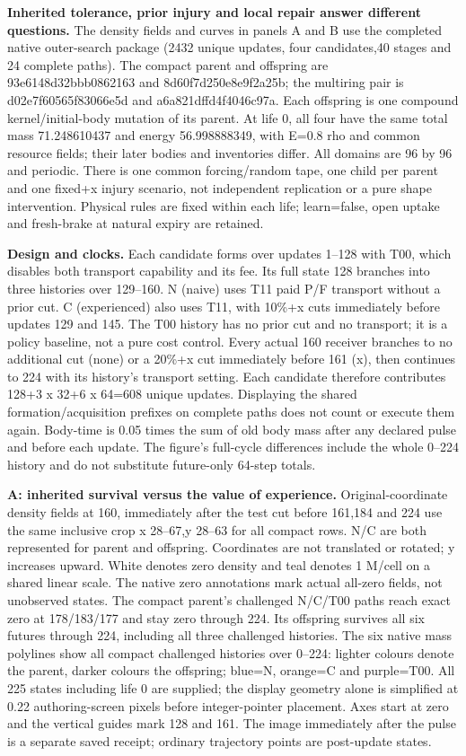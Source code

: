 \textbf{Inherited tolerance, prior injury and local repair answer different questions.}
The density fields and curves in panels A and B use the completed native outer-search package (2432 unique updates, four candidates,40 stages and 24 complete paths). The compact parent and offspring are 93e6148d32bbb0862163 and 8d60f7d250e8e9f2a25b; the multiring pair is d02e7f60565f83066e5d and a6a821dffd4f4046c97a. Each offspring is one compound kernel/initial-body mutation of its parent. At life 0, all four have the same total mass 71.248610437 and energy 56.998888349, with E=0.8 rho and common resource fields; their later bodies and inventories differ. All domains are 96 by 96 and periodic. There is one common forcing/random tape, one child per parent and one fixed+x injury scenario, not independent replication or a pure shape intervention. Physical rules are fixed within each life; learn=false, open uptake and fresh-brake at natural expiry are retained.

\textbf{Design and clocks.} Each candidate forms over updates 1--128 with T00, which disables both transport capability and its fee. Its full state 128 branches into three histories over 129--160. N (naive) uses T11 paid P/F transport without a prior cut. C (experienced) also uses T11, with 10\%+x cuts immediately before updates 129 and 145. The T00 history has no prior cut and no transport; it is a policy baseline, not a pure cost control. Every actual 160 receiver branches to no additional cut (none) or a 20\%+x cut immediately before 161 (x), then continues to 224 with its history's transport setting. Each candidate therefore contributes 128+3 x 32+6 x 64=608 unique updates. Displaying the shared formation/acquisition prefixes on complete paths does not count or execute them again. Body-time is 0.05 times the sum of old body mass after any declared pulse and before each update. The figure's full-cycle differences include the whole 0--224 history and do not substitute future-only 64-step totals.

\textbf{A: inherited survival versus the value of experience.} Original-coordinate density fields at 160, immediately after the test cut before 161,184 and 224 use the same inclusive crop x 28--67,y 28--63 for all compact rows. N/C are both represented for parent and offspring. Coordinates are not translated or rotated; y increases upward. White denotes zero density and teal denotes 1 M/cell on a shared linear scale. The native zero annotations mark actual all-zero fields, not unobserved states. The compact parent's challenged N/C/T00 paths reach exact zero at 178/183/177 and stay zero through 224. Its offspring survives all six futures through 224, including all three challenged histories. The six native mass polylines show all compact challenged histories over 0--224: lighter colours denote the parent, darker colours the offspring; blue=N, orange=C and purple=T00. All 225 states including life 0 are supplied; the display geometry alone is simplified at 0.22 authoring-screen pixels before integer-pointer placement. Axes start at zero and the vertical guides mark 128 and 161. The image immediately after the pulse is a separate saved receipt; ordinary trajectory points are post-update states.

